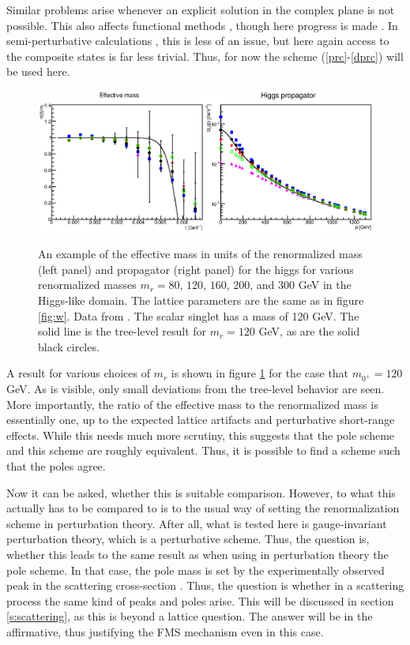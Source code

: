 \documentclass[final,12pt]{article}
\newcommand*{\prefr}[2]{(\ref{#1}-\ref{#2})}
\newcommand*{\1}{1\!\!\!\bot}
\begin{document}
Similar problems arise whenever an explicit solution in the complex plane is not possible. This also affects functional methods \cite{Benes:2008ir,Fister:2010yw,Gies:2015lia}, though here progress is made \cite{Strauss:2012as,Pawlowski:2015mia}. In semi-perturbative calculations \cite{Capri:2012cr,Capri:2017abz}, this is less of an issue, but here again access to the composite states is far less trivial. Thus, for now the scheme \prefr{prc}{dprc} will be used here.

\begin{figure}
\includegraphics[width=\linewidth]{h}\\
\caption{\label{fig:h}An example of the effective mass in units of the renormalized mass (left panel) and propagator (right panel) for the higgs for various renormalized masses $m_r=80$, $120$, $160$, $200$, and $300$ GeV in the Higgs-like domain. The lattice parameters are the same as in figure \ref{fig:w}. Data from \cite{Maas:2013aia,Maas:unpublished}. The scalar singlet has a mass of 120 GeV. The solid line is the tree-level result for $m_r=120$ GeV, as are the solid black circles.}
\end{figure}

A result for various choices of $m_r$ is shown in figure \ref{fig:h} for the case that $m_{0^+}=120$ GeV. As is visible, only small deviations from the tree-level behavior are seen. More importantly, the ratio of the effective mass to the renormalized mass is essentially one, up to the expected lattice artifacts and perturbative short-range effects. While this needs much more scrutiny, this suggests that the pole scheme and this scheme are roughly equivalent. Thus, it is possible to find a scheme such that the poles agree.

Now it can be asked, whether this is suitable comparison. However, to what this actually has to be compared to is to the usual way of setting the renormalization scheme in perturbation theory. After all, what is tested here is gauge-invariant perturbation theory, which is a perturbative scheme. Thus, the question is, whether this leads to the same result as when using in perturbation theory the pole scheme. In that case, the pole mass is set by the experimentally observed peak in the scattering cross-section \cite{Bohm:2001yx,Einhorn:1992um}. Thus, the question is whether in a scattering process the same kind of peaks and poles arise. This will be discussed in section \ref{s:scattering}, as this is beyond a lattice question. The answer will be in the affirmative, thus justifying the FMS mechanism even in this case.
\end{document}
